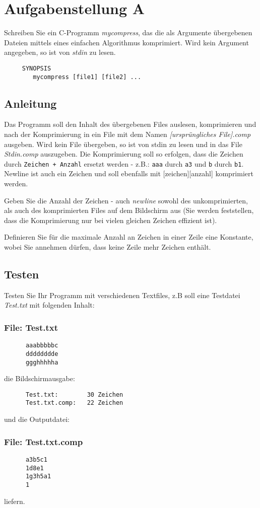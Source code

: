 




\section*{Aufgabenstellung A}
       Schreiben Sie ein C-Programm \emph{mycompress},
      das die als Argumente übergebenen Dateien mittels
      eines einfachen Algorithmus komprimiert.
      Wird kein Argument angegeben, so ist von
      \emph{stdin} zu lesen.
\begin{verbatim}
	 SYNOPSIS
        mycompress [file1] [file2] ...
\end{verbatim}

\subsection*{Anleitung}
      Das Programm soll den Inhalt des übergebenen Files
      auslesen, komprimieren und nach der Komprimierung in ein
      File mit dem Namen \emph{[ursprüngliches File].comp}
      ausgeben. Wird kein File übergeben, so ist von stdin zu
      lesen und in das File \emph{Stdin.comp} auszugeben. Die
      Komprimierung soll so erfolgen, dass die Zeichen durch
      \verb|Zeichen + Anzahl| ersetzt werden - z.B.: \verb|aaa| durch \verb|a3|
      und \verb|b| durch \verb|b1|. 
	Newline ist auch ein Zeichen und soll ebenfalls mit [zeichen][anzahl] komprimiert werden.
      
      Geben Sie die Anzahl der Zeichen - auch \emph{newline}
      sowohl des unkomprimierten, als auch des komprimierten Files
      auf dem Bildschirm aus (Sie werden feststellen, dass die
      Komprimierung nur bei vielen gleichen Zeichen effizient ist).

 	
      
      Definieren Sie für die maximale Anzahl an Zeichen in einer
      Zeile eine Konstante, wobei Sie annehmen dürfen, dass keine
      Zeile mehr Zeichen enthält.

      
\subsection*{Testen}
      Testen Sie Ihr Programm mit verschiedenen Textfiles, z.B
      soll eine Testdatei \emph{Test.txt} mit folgenden Inhalt:
\subsubsection*{File: Test.txt}
\begin{verbatim}
      aaabbbbbc
      dddddddde
      ggghhhhha
\end{verbatim}
die Bildschirmausgabe:
\begin{verbatim}
      Test.txt:        30 Zeichen
      Test.txt.comp:   22 Zeichen
\end{verbatim}

und die Outputdatei:

\subsubsection*{File: Test.txt.comp}
\begin{verbatim}
      a3b5c1
      1d8e1
      1g3h5a1
      1
\end{verbatim}

liefern.

\osueguidelinesone



